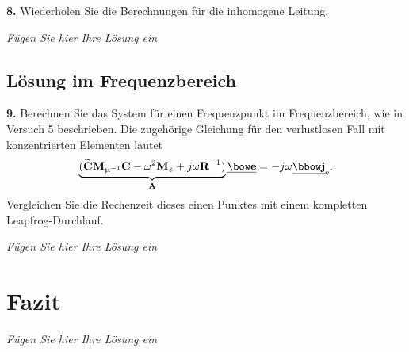 \documentclass[Protokollheft.tex]{subfiles}
\begin{document}
\begin{framed}
	\noindent \textbf{8.} Wiederholen Sie die Berechnungen für die inhomogene Leitung.\label{exer:calc4inhomTLine}
\end{framed}

\emph{Fügen Sie hier Ihre Lösung ein}

{\subsection{Lösung im Frequenzbereich}}

\begin{framed}
	\noindent \textbf{9.} Berechnen Sie das System für einen Frequenzpunkt im
Frequenzbereich, wie in Versuch 5 beschrieben. Die zugehörige
Gleichung für den verlustlosen Fall mit konzentrierten
Elementen lautet
\begin{equation}
	\underbrace{(\curldfit \Mmui \curlfit -
	\omega^2 \Meps + j \omega {\textbf{R}}^{-1} )}_{\Amat} \ul \efit = - j \omega \ul \jfit_{\text{e}}.
\end{equation}
Vergleichen Sie die Rechenzeit dieses einen Punktes mit einem
kompletten Leapfrog-Durchlauf.\label{exer:cmpFreqSolWithLeapfrog}
\end{framed}

\emph{Fügen Sie hier Ihre Lösung ein}



\section{Fazit}
\emph{Fügen Sie hier Ihre Lösung ein}
\end{document}
